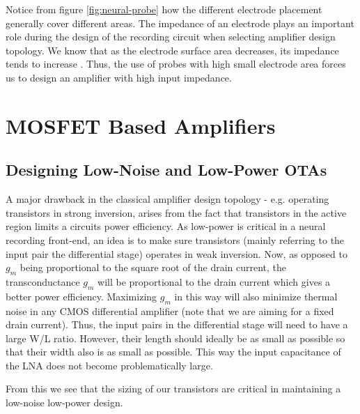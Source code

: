     Notice from figure \ref{fig:neural-probe} how the different electrode placement generally cover different areas. The impedance of an electrode plays an 
    important role during the design of the recording circuit when selecting amplifier design topology. We know that as the electrode surface 
    area decreases, its impedance tends to increase \cite{yoo2011biomedical-cmos}. Thus, the use of probes with high small electrode area
    forces us to design an amplifier with high input impedance.
   
   
   \section{MOSFET Based Amplifiers}\label{subsec:trans-amp-basics}
    
      \subsection{Designing Low-Noise and Low-Power \acs{OTA}s}
	A major drawback in the classical amplifier design topology - e.g. operating transistors in strong inversion, arises from the fact that transistors in the active region limits a circuits power efficiency. As low-power 
	is critical in a neural recording front-end, an idea is to make sure transistors (mainly referring to the input pair the differential stage) operates in weak inversion. Now, as opposed to $g_m$ being proportional to the square 
	root of the drain current, the transconductance $g_m$ will be proportional to the drain current \cite{harrison2003low} which gives a better power efficiency. Maximizing $g_m$ in this way will also minimize 
	thermal noise in any CMOS differential amplifier \cite{johns2008analog} (note that we are aiming for a fixed drain current). Thus, the input pairs in the differential stage  will need  to  have a  large  W/L  ratio. However, 
	their length should ideally be as small as possible so that their width also is as small as possible. This way the input capacitance of the LNA does not become problematically large.
	
	From this we see that the sizing of our transistors are critical in maintaining a low-noise low-power design.
